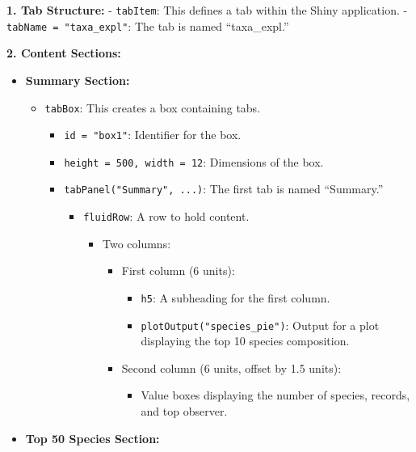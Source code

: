 \documentclass[
]{book}
\providecommand{\tightlist}{%
  \setlength{\itemsep}{0pt}\setlength{\parskip}{0pt}}
\begin{document}
\textbf{1. Tab Structure:}
- \texttt{tabItem}: This defines a tab within the Shiny application.
- \texttt{tabName\ =\ "taxa\_expl"}: The tab is named ``taxa\_expl.''

\textbf{2. Content Sections:}

\begin{itemize}
\tightlist
\item
  \textbf{Summary Section:}

  \begin{itemize}
  \tightlist
  \item
    \texttt{tabBox}: This creates a box containing tabs.

    \begin{itemize}
    \tightlist
    \item
      \texttt{id\ =\ "box1"}: Identifier for the box.
    \item
      \texttt{height\ =\ 500,\ width\ =\ 12}: Dimensions of the box.
    \item
      \texttt{tabPanel("Summary",\ ...)}: The first tab is named ``Summary.''

      \begin{itemize}
      \tightlist
      \item
        \texttt{fluidRow}: A row to hold content.

        \begin{itemize}
        \tightlist
        \item
          Two columns:

          \begin{itemize}
          \tightlist
          \item
            First column (6 units):

            \begin{itemize}
            \tightlist
            \item
              \texttt{h5}: A subheading for the first column.
            \item
              \texttt{plotOutput("species\_pie")}: Output for a plot displaying the top 10 species composition.
            \end{itemize}
          \item
            Second column (6 units, offset by 1.5 units):

            \begin{itemize}
            \tightlist
            \item
              Value boxes displaying the number of species, records, and top observer.
            \end{itemize}
          \end{itemize}
        \end{itemize}
      \end{itemize}
    \end{itemize}
  \end{itemize}
\item
  \textbf{Top 50 Species Section:}


\end{itemize}
\end{document}
